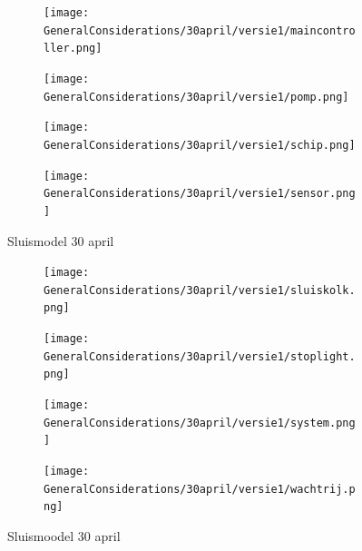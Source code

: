 \documentclass{article}
\begin{document}
	\begin{figure}
		\centering
		\begin{subfigure}{0.45\linewidth}
			\texttt{[image: GeneralConsiderations/30april/versie1/maincontroller.png]}
			\caption{}
			\label{fig:1a}
		\end{subfigure}\hfill
		\begin{subfigure}{0.45\linewidth}
			\texttt{[image: GeneralConsiderations/30april/versie1/pomp.png]}
			\caption{}
			\label{fig:1a}
		\end{subfigure}
		
		\begin{subfigure}{0.45\linewidth}
			\texttt{[image: GeneralConsiderations/30april/versie1/schip.png]}
			\caption{}
			\label{fig:1a}
		\end{subfigure}\hfill
		\begin{subfigure}{0.45\linewidth}
			\texttt{[image: GeneralConsiderations/30april/versie1/sensor.png]}
			\caption{}
			\label{fig:1a}
		\end{subfigure}
		\caption{Sluismodel 30 april}
		\label{fig:1}
	\end{figure}
	
	
	
	
	
	\begin{figure}
		\centering
		\begin{subfigure}{0.45\linewidth}
			\texttt{[image: GeneralConsiderations/30april/versie1/sluiskolk.png]}
			\caption{}
			\label{fig:1a}
		\end{subfigure}\hfill
		\begin{subfigure}{0.45\linewidth}
			\texttt{[image: GeneralConsiderations/30april/versie1/stoplight.png]}
			\caption{}
			\label{fig:1a}
		\end{subfigure}
		
		\begin{subfigure}{0.45\linewidth}
			\texttt{[image: GeneralConsiderations/30april/versie1/system.png]}
			\caption{}
			\label{fig:1a}
		\end{subfigure}\hfill
		\begin{subfigure}{0.45\linewidth}
			\texttt{[image: GeneralConsiderations/30april/versie1/wachtrij.png]}    \caption{}
			\label{fig:1a}
		\end{subfigure}
		\caption{Sluismoodel 30 april}
		\label{fig:1}
	\end{figure}
	
	
\end{document}
